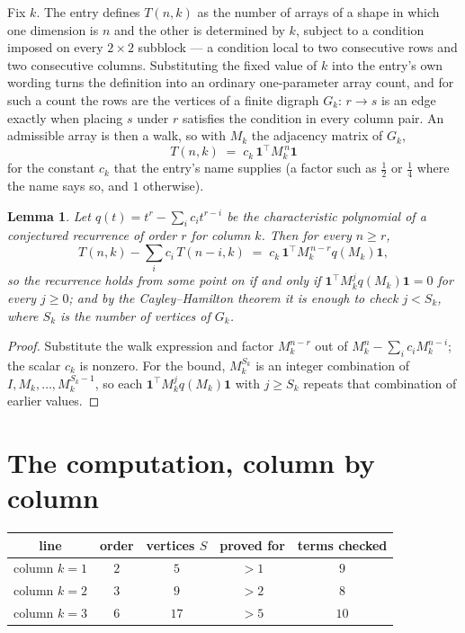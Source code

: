 \documentclass[11pt,a4paper]{article}
\theoremstyle{plain}
\newtheorem{lemma}[theorem]{Lemma}
\theoremstyle{definition}
\begin{document}
Fix $k$. The entry defines $T(n,k)$ as the number of arrays of a shape in which one dimension
is $n$ and the other is determined by $k$, subject to a condition imposed on every
$2\times2$ subblock --- a condition local to two consecutive rows and two consecutive columns.
Substituting the fixed value of $k$ into the entry's own wording turns the definition into an
ordinary one-parameter array count, and for such a count the rows are the vertices of a finite
digraph $G_k$: $r\to s$ is an edge exactly when placing $s$ under $r$ satisfies the condition
in every column pair. An admissible array is then a walk, so with $M_k$ the adjacency matrix
of $G_k$,
\[
T(n,k)\;=\;c_k\,\mathbf{1}^{\!\top}M_k^{\,n}\mathbf{1}
\]
for the constant $c_k$ that the entry's name supplies (a factor such as $\tfrac12$ or
$\tfrac14$ where the name says so, and $1$ otherwise).

\begin{lemma}\label{lem:crit}
Let $q(t)=t^{r}-\sum_i c_it^{r-i}$ be the characteristic polynomial of a conjectured
recurrence of order $r$ for column $k$. Then for every $n\ge r$,
\[
T(n,k)-\sum_i c_i\,T(n-i,k)\;=\;c_k\,\mathbf{1}^{\!\top}M_k^{\,n-r}q(M_k)\mathbf{1},
\]
so the recurrence holds from some point on if and only if
$\mathbf{1}^{\!\top}M_k^{j}q(M_k)\mathbf{1}=0$ for every $j\ge0$; and by the
Cayley--Hamilton theorem it is enough to check $j<S_k$, where $S_k$ is the number of vertices
of $G_k$.
\end{lemma}

\begin{proof}
Substitute the walk expression and factor $M_k^{n-r}$ out of $M_k^{n}-\sum_ic_iM_k^{n-i}$;
the scalar $c_k$ is nonzero. For the bound, $M_k^{S_k}$ is an integer combination of
$I,M_k,\dots,M_k^{S_k-1}$, so each $\mathbf{1}^{\!\top}M_k^{j}q(M_k)\mathbf{1}$ with
$j\ge S_k$ repeats that combination of earlier values.
\end{proof}

\section{The computation, column by column}

\begin{center}
\begin{tabular}{ccccc}
line & order & vertices $S$ & proved for & terms checked \\ \hline
column $k$$=1$ & $2$ & $5$ & $>1$ & $9$ \\
column $k$$=2$ & $3$ & $9$ & $>2$ & $8$ \\
column $k$$=3$ & $6$ & $17$ & $>5$ & $10$ \\
\end{tabular}
\end{center}
\end{document}
